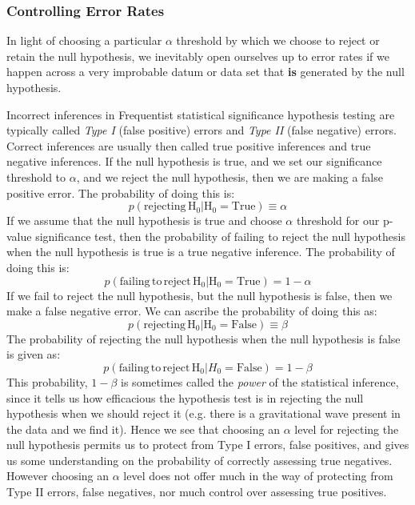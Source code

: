 \subsubsection{Controlling Error Rates}

In light of choosing a particular $\alpha$ threshold by which we choose to reject or retain the null hypothesis, we inevitably open ourselves up to error rates if we happen across a very improbable datum or data set that \textbf{is} generated by the null hypothesis.

Incorrect inferences in Frequentist statistical significance hypothesis testing are typically called \textit{Type I} (false positive) errors and \textit{Type II} (false negative) errors. Correct inferences are usually then called true positive inferences and true negative inferences. If the null hypothesis is true, and we set our significance threshold to $\alpha$, and we reject the null hypothesis, then we are making a false positive error. The probability of doing this is:
\begin{equation}
    p\left(\mathrm{rejecting \, H_{0}}| \mathrm{H_{0}} = \mathrm{True}\right) \equiv \alpha
\end{equation}
If we assume that the null hypothesis is true and choose $\alpha$ threshold for our p-value significance test, then the probability of failing to reject the null hypothesis when the null hypothesis is true is a true negative inference. The probability of doing this is:
\begin{equation}
    p\left(\mathrm{failing \, to \, reject \, H_{0}}| \mathrm{H_{0}} = \mathrm{True}\right) = 1 - \alpha
\end{equation}
 If we fail to reject the null hypothesis, but the null hypothesis is false, then we make a false negative error. We can ascribe the probability of doing this as:
 \begin{equation}
    p\left(\mathrm{rejecting \, H_{0}}| \mathrm{H_{0}} = \mathrm{False}\right) \equiv \beta
 \end{equation}
 The probability of rejecting the null hypothesis when the null hypothesis is false is given as:
 \begin{equation}
    p(\mathrm{failing \, to \, reject \, H_{0}}| H_{0} = \mathrm{False})= 1 - \beta    
 \end{equation}
 This probability, $1- \beta$ is sometimes called the \textit{power} of the statistical inference, since it tells us how efficacious the hypothesis test is in rejecting the null hypothesis when we should reject it (e.g. there is a gravitational wave present in the data and we find it). Hence we see that choosing an $\alpha$ level for rejecting the null hypothesis permits us to protect from Type I errors, false positives, and gives us some understanding on the probability of correctly assessing true negatives. However choosing an $\alpha$ level does not offer much in the way of protecting from Type II errors, false negatives, nor much control over assessing true positives.

